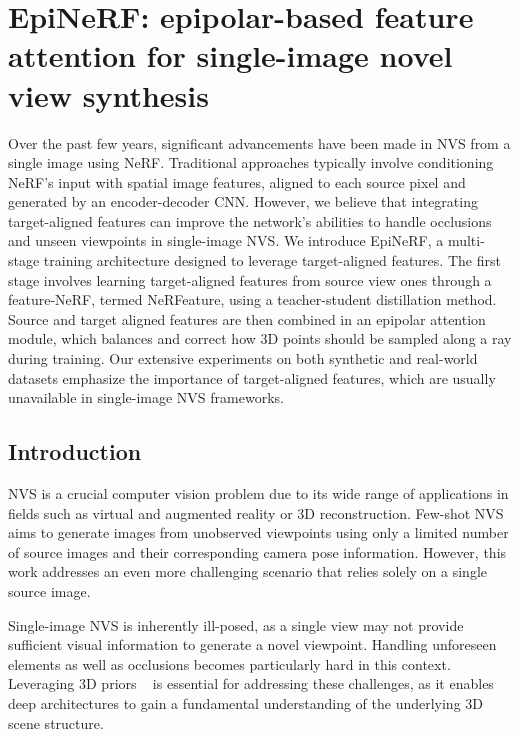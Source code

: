 \chapter{EpiNeRF: epipolar-based feature attention for single-image novel view synthesis}
\label{chapter:epinerf}



Over the past few years, significant advancements have been made in \ac{NVS} from a single image using \ac{NeRF}. Traditional approaches typically involve conditioning \ac{NeRF}'s input with spatial image features, aligned to each source pixel and generated by an encoder-decoder \ac{CNN}. However, we believe that integrating target-aligned features can improve the network's abilities to handle occlusions and unseen viewpoints in single-image NVS. We introduce EpiNeRF, a multi-stage training architecture designed to leverage target-aligned features. The first stage involves learning target-aligned features from source view ones through a feature-NeRF, termed NeRFeature, using a teacher-student distillation method. Source and target aligned features are then combined in an epipolar attention module, which balances and correct how 3D points should be sampled along a ray during training. Our extensive experiments on both synthetic and real-world datasets emphasize the importance of target-aligned features, which are usually unavailable in single-image \ac{NVS} frameworks.

\section{Introduction}
NVS is a crucial computer vision problem due to its wide range of applications in fields such as virtual and augmented reality or 3D reconstruction. Few-shot NVS aims to generate images from unobserved viewpoints using only a limited number of source images and their corresponding camera pose information. However, this work addresses an even more challenging scenario that relies solely on a single source image.

Single-image NVS is inherently ill-posed, as a single view may not provide sufficient visual information to generate a novel viewpoint. Handling unforeseen elements as well as occlusions becomes particularly hard in this context. Leveraging 3D priors ~\cite{saito2019pifu,johari2022geonerf} is essential for addressing these challenges, as it enables deep architectures to gain a fundamental understanding of the underlying 3D scene structure.

